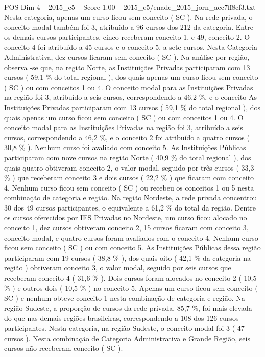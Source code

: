 \begin{textsample}{POS Dim 4 – 2015\_c5 – Score 1.00 – 2015\_c5/enade\_2015\_jorn\_aec7ff8cf3.txt}
Nesta categoria, apenas um curso ficou sem conceito ( SC ).
Na rede privada, o conceito modal também foi 3, atribuído a 96 cursos dos 212 da categoria.
Entre os demais cursos participantes, cinco receberam conceito 1, e 49, conceito 2.
O conceito 4 foi atribuído a 45 cursos e o conceito 5, a sete cursos.
Nesta Categoria Administrativa, dez cursos ficaram sem conceito ( SC ).
Na análise por região, observa -se que, na região Norte, as Instituições Privadas participaram com 13 cursos ( 59,1 \% do total regional ), dos quais apenas um curso ficou sem conceito ( SC ) ou com conceitos 1 ou 4.
O conceito modal para as Instituições Privadas na região foi 3, atribuído a seis cursos, correspondendo a 46,2 \%, e o conceito As Instituições Privadas participaram com 13 cursos ( 59,1 \% do total regional ), dos quais apenas um curso ficou sem conceito ( SC ) ou com conceitos 1 ou 4.
O conceito modal para as Instituições Privadas na região foi 3, atribuído a seis cursos, correspondendo a 46,2 \%, e o conceito 2 foi atribuído a quatro cursos ( 30,8 \% ).
Nenhum curso foi avaliado com conceito 5.
As Instituições Públicas participaram com nove cursos na região Norte ( 40,9 \% do total regional ), dos quais quatro obtiveram conceito 2, o valor modal, seguido por três cursos ( 33,3 \% ) que receberam conceito 3 e dois cursos ( 22,2 \% ) que ficaram com conceito 4.
Nenhum curso ficou sem conceito ( SC ) ou recebeu os conceitos 1 ou 5 nesta combinação de categoria e região.
Na região Nordeste, a rede privada concentrou 30 dos 49 cursos participantes, o equivalente a 61,2 \% do total da região.
Dentre os cursos oferecidos por IES Privadas no Nordeste, um curso ficou alocado no conceito 1, dez cursos obtiveram conceito 2, 15 cursos ficaram com conceito 3, conceito modal, e quatro cursos foram avaliados com o conceito 4.
Nenhum curso ficou sem conceito ( SC ) ou com conceito 5.
As Instituições Públicas dessa região participaram com 19 cursos ( 38,8 \% ), dos quais oito ( 42,1 \% da categoria na região ) obtiveram conceito 3, o valor modal, seguido por seis cursos que receberam conceito 4 ( 31,6 \% ).
Dois cursos foram alocados no conceito 2 ( 10,5 \% ) e outros dois ( 10,5 \% ) no conceito 5.
Apenas um curso ficou sem conceito ( SC ) e nenhum obteve conceito 1 nesta combinação de categoria e região.
Na região Sudeste, a proporção de cursos da rede privada, 85,7 \%, foi mais elevada do que nas demais regiões brasileiras, correspondendo a 108 dos 126 cursos participantes.
Nesta categoria, na região Sudeste, o conceito modal foi 3 ( 47 cursos ).
Nesta combinação de Categoria Administrativa e Grande Região, seis cursos não receberam conceito ( SC ).

\end{textsample}
